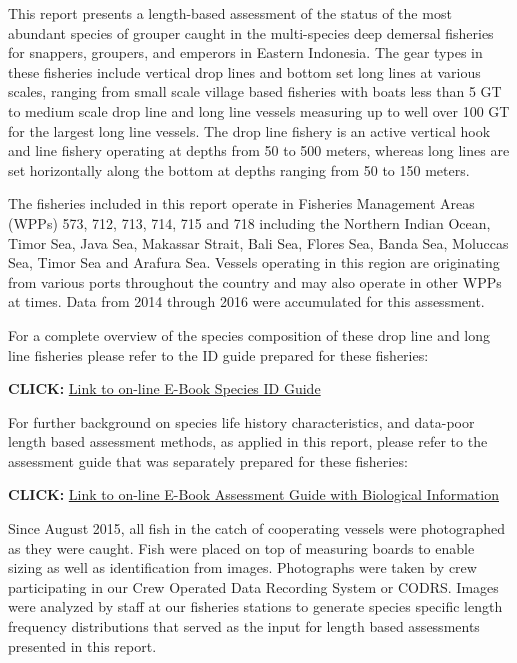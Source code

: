 This report presents a length-based assessment of the status of the most abundant species of grouper caught in the multi-species deep demersal fisheries for snappers, groupers, and emperors in Eastern Indonesia. The gear types in these fisheries include vertical drop lines and bottom set long lines at various scales, ranging from small scale village based fisheries with boats less than 5 GT to medium scale drop line and long line vessels measuring up to well over 100 GT for the largest long line vessels. The drop line fishery is an active vertical hook and line fishery operating at depths from 50 to 500 meters, whereas long lines are set horizontally along the bottom at depths ranging from 50 to 150 meters.

The fisheries included in this report operate in Fisheries Management Areas (WPPs) 573, 712, 713, 714, 715 and 718 including the Northern Indian Ocean, Timor Sea, Java Sea, Makassar Strait, Bali Sea, Flores Sea, Banda Sea, Moluccas Sea, Timor Sea and Arafura Sea. Vessels operating in this region are originating from various ports throughout the country and may also operate in other WPPs at times. Data from 2014 through 2016 were accumulated for this assessment.

For a complete overview of the species composition of these drop line and long line fisheries please refer to the ID guide prepared for these fisheries:

\textbf{CLICK: }\href{http://72.14.187.103:8080/ifish/pub/TNC_FishID.pdf}{Link to on-line E-Book Species ID Guide}

For further background on species life history characteristics, and data-poor length based assessment methods, as applied in this report, please refer to the assessment guide that was separately prepared for these fisheries:

\textbf{CLICK: }\href{http://72.14.187.103:8080/ifish/pub/DeepSlopeSpeciesAssessmentTool.pdf}{Link to on-line E-Book Assessment Guide with Biological Information}

Since August 2015, all fish in the catch of cooperating vessels were photographed as they were caught. Fish were placed on top of measuring boards to enable sizing as well as identification from images. Photographs were taken by crew participating in our Crew Operated Data Recording System or CODRS. Images were analyzed by staff at our fisheries stations to generate species specific length frequency distributions that served as the input for length based assessments presented in this report.

